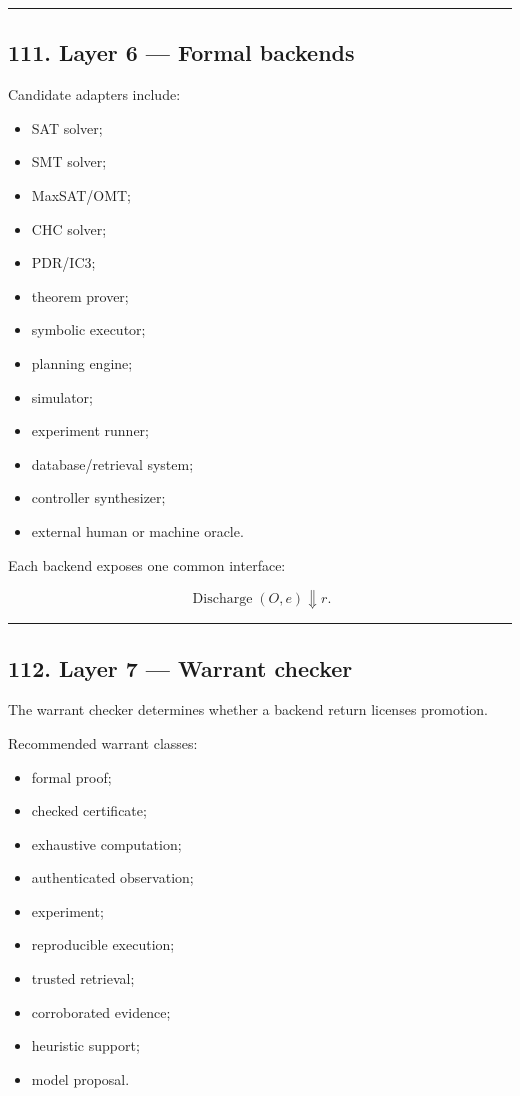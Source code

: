 \documentclass[
]{article}
\providecommand{\tightlist}{%
  \setlength{\itemsep}{0pt}\setlength{\parskip}{0pt}}
\begin{document}
\begin{center}\rule{0.5\linewidth}{0.5pt}\end{center}

\subsection{111. Layer 6 --- Formal
backends}\label{layer-6-formal-backends}

Candidate adapters include:

\begin{itemize}
\tightlist
\item
  SAT solver;
\item
  SMT solver;
\item
  MaxSAT/OMT;
\item
  CHC solver;
\item
  PDR/IC3;
\item
  theorem prover;
\item
  symbolic executor;
\item
  planning engine;
\item
  simulator;
\item
  experiment runner;
\item
  database/retrieval system;
\item
  controller synthesizer;
\item
  external human or machine oracle.
\end{itemize}

Each backend exposes one common interface:

\[
\boxed{
\operatorname{Discharge}(O,e)\Downarrow r.
}
\]

\begin{center}\rule{0.5\linewidth}{0.5pt}\end{center}

\subsection{112. Layer 7 --- Warrant
checker}\label{layer-7-warrant-checker}

The warrant checker determines whether a backend return licenses
promotion.

Recommended warrant classes:

\begin{itemize}
\tightlist
\item
  formal proof;
\item
  checked certificate;
\item
  exhaustive computation;
\item
  authenticated observation;
\item
  experiment;
\item
  reproducible execution;
\item
  trusted retrieval;
\item
  corroborated evidence;
\item
  heuristic support;
\item
  model proposal.
\end{itemize}
\end{document}
